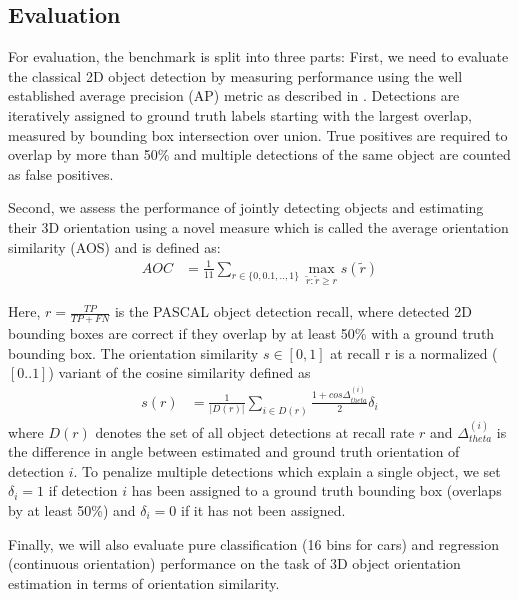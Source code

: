 
\subsection{Evaluation}

For evaluation, the benchmark is split into three parts: 
First, we need to evaluate the classical
2D object detection by measuring performance using the
well established average precision (AP) metric as described
in \cite{everingham2010pascal}.
Detections are iteratively assigned to ground truth
labels starting with the largest overlap, measured by bounding
box intersection over union. 
True positives are required 
to overlap by more than 50\% and multiple detections
of the same object are counted as false positives. 

Second, we assess the performance
of jointly detecting objects and estimating their 3D
orientation using a novel measure which is called the average
orientation similarity (AOS) \cite{Geiger2012CVPR} and is defined as:
\begin{align}
AOC & = \frac{1}{11} \sum_{r \in \{0,0.1,..,1\}} \max_{\tilde{r}:\tilde{r} \geq r} s(\tilde{r})
\end{align}

Here, $r = \frac{TP}{TP+FN}$ is the PASCAL object detection recall,
where detected 2D bounding boxes are correct if they overlap
by at least 50\% with a ground truth bounding box. The
orientation similarity $s \in [0, 1]$ at recall r is a normalized
($[0..1]$) variant of the cosine similarity defined as
\begin{align}
s(r) & = \frac{1}{|D(r)|} \sum_{i \in D(r)} \frac{1 + cos \Delta_{theta}^{(i)}}{2} \delta_i
\end{align}
where $D(r)$ denotes the set of all object detections at recall
rate 
$r$ and $\Delta_{theta}^{(i)}$
is the difference in angle between estimated
and ground truth orientation of detection $i$. To penalize multiple
detections which explain a single object, we set $\delta_i = 1$
if detection $i$ has been assigned to a ground truth bounding
box (overlaps by at least 50\%) and $\delta_i = 0$ if it has not been
assigned.

Finally, we will also evaluate pure classification (16 bins for
cars) and regression (continuous orientation) performance
on the task of 3D object orientation estimation in terms of
orientation similarity.



